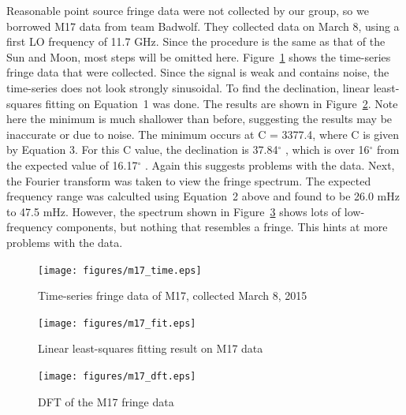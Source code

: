 \documentclass[12pt]{article}
\newcommand{\degree}{\ensuremath{^\circ} }
\begin{document}
Reasonable point source fringe data were not collected by our group, so we borrowed M17 data from team Badwolf.
They collected data on March 8, using a first LO frequency of 11.7 GHz.
Since the procedure is the same as that of the Sun and Moon, most steps will be omitted here.
Figure~\ref{fig:m17_time} shows the time-series fringe data that were collected.
Since the signal is weak and contains noise, the time-series does not look strongly sinusoidal.
To find the declination, linear least-squares fitting on Equation~1 was done.
The results are shown in Figure~\ref{fig:m17_fit}.
Note here the minimum is much shallower than before, suggesting the results may be inaccurate or due to noise.
The minimum occurs at C = 3377.4, where C is given by Equation 3.
For this C value, the declination is 37.84\degree, which is over 16\degree from the expected value of 16.17\degree.
Again this suggests problems with the data.
Next, the Fourier transform was taken to view the fringe spectrum.
The expected frequency range was calculted using Equation~2 above and found to be 26.0 mHz to 47.5 mHz.
However, the spectrum shown in Figure~\ref{fig:m17_dft} shows lots of low-frequency components, but nothing that resembles a fringe.
This hints at more problems with the data.


\begin{figure}
\centering
\texttt{[image: figures/m17\_time.eps]}
\caption{Time-series fringe data of M17, collected March 8, 2015}
\label{fig:m17_time}
\end{figure}

\begin{figure}
\centering
\texttt{[image: figures/m17\_fit.eps]}
\caption{Linear least-squares fitting result on M17 data}
\label{fig:m17_fit}
\end{figure}

\begin{figure}
\centering
\texttt{[image: figures/m17\_dft.eps]}
\caption{DFT of the M17 fringe data}
\label{fig:m17_dft}
\end{figure}


%

\enddocument
\end{document}
